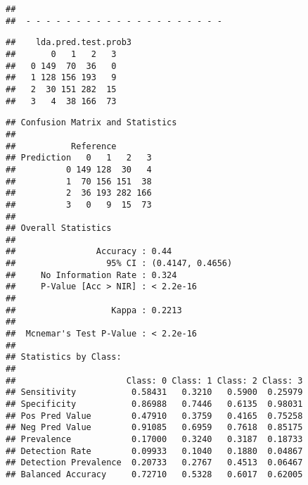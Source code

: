 \documentclass[
]{article}
\newenvironment{Shaded}{\begin{snugshade}}{\end{snugshade}}
\newcommand{\AttributeTok}[1]{\textcolor[rgb]{0.77,0.63,0.00}{#1}}
\newcommand{\FunctionTok}[1]{\textcolor[rgb]{0.00,0.00,0.00}{#1}}
\newcommand{\NormalTok}[1]{#1}
\newcommand{\OtherTok}[1]{\textcolor[rgb]{0.56,0.35,0.01}{#1}}
\newcommand{\SpecialCharTok}[1]{\textcolor[rgb]{0.00,0.00,0.00}{#1}}
\begin{document}
\begin{verbatim}
## 
##  - - - - - - - - - - - - - - - - - - - -
\end{verbatim}

\begin{Shaded}
\end{Shaded}

\begin{verbatim}
##    lda.pred.test.prob3
##       0   1   2   3
##   0 149  70  36   0
##   1 128 156 193   9
##   2  30 151 282  15
##   3   4  38 166  73
\end{verbatim}

\begin{Shaded}
\end{Shaded}

\begin{verbatim}
## Confusion Matrix and Statistics
## 
##           Reference
## Prediction   0   1   2   3
##          0 149 128  30   4
##          1  70 156 151  38
##          2  36 193 282 166
##          3   0   9  15  73
## 
## Overall Statistics
##                                           
##                Accuracy : 0.44            
##                  95% CI : (0.4147, 0.4656)
##     No Information Rate : 0.324           
##     P-Value [Acc > NIR] : < 2.2e-16       
##                                           
##                   Kappa : 0.2213          
##                                           
##  Mcnemar's Test P-Value : < 2.2e-16       
## 
## Statistics by Class:
## 
##                      Class: 0 Class: 1 Class: 2 Class: 3
## Sensitivity           0.58431   0.3210   0.5900  0.25979
## Specificity           0.86988   0.7446   0.6135  0.98031
## Pos Pred Value        0.47910   0.3759   0.4165  0.75258
## Neg Pred Value        0.91085   0.6959   0.7618  0.85175
## Prevalence            0.17000   0.3240   0.3187  0.18733
## Detection Rate        0.09933   0.1040   0.1880  0.04867
## Detection Prevalence  0.20733   0.2767   0.4513  0.06467
## Balanced Accuracy     0.72710   0.5328   0.6017  0.62005
\end{verbatim}
\end{document}
